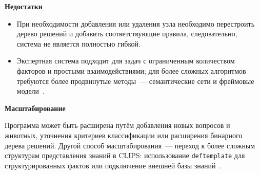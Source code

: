 \documentclass[a4paper,final]{article}
\begin{document}
\textbf{Недостатки}

\begin{itemize}
	\item При необходимости добавления или удаления узла необходимо перестроить дерево решений и добавить соответствующие правила, следовательно, система не является полностью гибкой.
	\item Экспертная система подходит для задач с ограниченным количеством факторов и простыми взаимодействиями; для более сложных алгоритмов требуются более продвинутые методы~--- семантические сети и фреймовые модели~\cite{gavrilova}.
\end{itemize}

\textbf{Масштабирование}

Программа может быть расширена путём добавления новых вопросов и животных, уточнения критериев классификации или расширения бинарного дерева решений. Другой способ масштабирования~--- переход к более сложным структурам представления знаний в CLIPS: использование \texttt{deftemplate} для структурированных фактов или подключение внешней базы знаний~\cite{habаров}.
\end{document}
